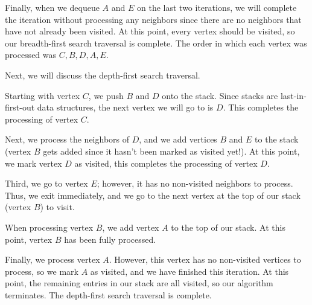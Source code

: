 Finally, when we dequeue $A$ and $E$ on the last two iterations, we will complete the iteration without processing any neighbors since there are no neighbors that have not already been visited. At this point, every vertex should be visited, so our breadth-first search traversal is complete. The order in which each vertex was processed was $C, B, D, A, E$. 


Next, we will discuss the depth-first search traversal. 


Starting with vertex $C$, we push $B$ and $D$ onto the stack. Since stacks are last-in-first-out data structures, the next vertex we will go to is $D$. This completes the processing of vertex $C$.

Next, we process the neighbors of $D$, and we add vertices $B$ and $E$ to the stack (vertex $B$ gets added since it hasn't been marked as visited yet!). At this point, we mark vertex $D$ as visited, this completes the processing of vertex $D$.

Third, we go to vertex $E$; however, it has no non-visited neighbors to process. Thus, we exit immediately, and we go to the next vertex at the top of our stack (vertex $B$) to visit. 

When processing vertex $B$, we add vertex $A$ to the top of our stack. At this point, vertex $B$ has been fully processed. 


Finally, we process vertex $A$. However, this vertex has no non-visited vertices to process, so we mark $A$ as visited, and we have finished this iteration. At this point, the remaining entries in our stack are all visited, so our algorithm terminates. The depth-first search traversal is complete.

